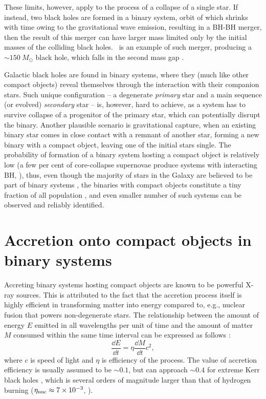 These limits, however, apply to the process of a collapse of a single star.
If instead, two black holes are formed in a binary system, orbit of which shrinks with time owing to the gravitational wave emission, resulting in a \gls{BH}-\gls{BH} merger, then the result of this merger can have larger mass limited only by the initial masses of the colliding black holes.
\GWxix\ is an example of such merger, producing a $\sim 150~M_\odot$ black hole, which falls in the second mass gap \citep{Abbott2020}.

Galactic black holes are found in binary systems, where they (much like other compact objects) reveal themselves through the interaction with their companion stars.
Such unique configuration -- a degenerate \textit{primary} star and a main sequence (or evolved) \textit{secondary} star -- is, however, hard to achieve, as a system has to survive collapse of a progenitor of the primary star, which can potentially disrupt the binary. 
Another plausible scenario is gravitational capture, when an existing binary star comes in close contact with a remnant of another star, forming a new binary with a compact object, leaving one of the initial stars single.
The probability of formation of a binary system hosting a compact object is relatively low (a few per cent of core-collapse supernovae produce systems with interacting \gls{BH}, \citealt{Kochanek2019}), thus, even though the majority of stars in the Galaxy are believed to be part of binary systems \citep[][$\sim 50\%$ of solar-type stars, see e.g.]{Tian2018}, the binaries with compact objects constitute a tiny fraction of all population \citep[][of the order of hundreds of \glspl{LMXB} in the Milky Way]{Shao2020}, and even smaller number of such systems can be observed and reliably identified.


\section{Accretion onto compact objects in binary systems}
Accreting binary systems hosting compact objects are known to be powerful X-ray sources.
This is attributed to the fact that the accretion process itself is highly efficient in transforming matter into energy compared to, e.g., nuclear fusion that powers non-degenerate stars.
The relationship between the amount of energy $E$ emitted in all wavelengths per unit of time and the amount of matter $M$ consumed within the same time interval can be expressed as follows \citep{AccretionPower}:
\begin{equation}
    \frac{\dd E}{\dd t} = \eta \frac{\dd M}{\dd t} c^2,
\end{equation}
where $c$ is speed of light and $\eta$ is efficiency of the process.
The value of accretion efficiency is usually assumed to be $\sim 0.1$, but can approach $\sim 0.4$ for extreme Kerr black holes \citep{Thorne1974}, which is several orders of magnitude larger than that of hydrogen burning ($\eta_{\mathrm{nuc}} \approx 7 \times 10^{-3}$, \citealt{AccretionPower}).

